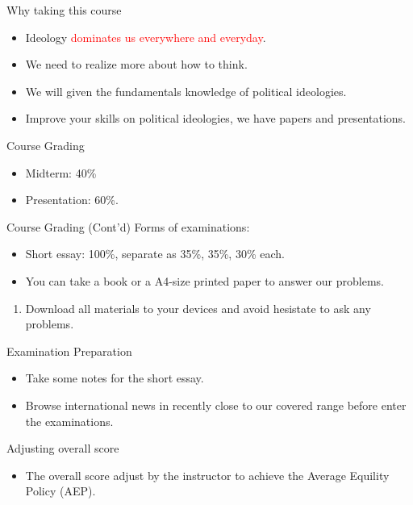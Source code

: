 \documentclass{beamer}
\begin{document}
\begin{frame}{Why taking this course}
\begin{itemize}
\item Ideology \textcolor{red}{dominates us everywhere and everyday}.
\item We need to realize more about how to think.
\item We will given the fundamentals knowledge of political ideologies.
\item Improve your skills on political ideologies, we have papers and presentations.
\end{itemize}
\end{frame}
\begin{frame}{Course Grading}
\begin{itemize}
\item Midterm: 40\%
\item Presentation: 60\%.
\end{itemize}
\end{frame}
\begin{frame}{Course Grading (Cont'd)}
Forms of examinations:
\begin{itemize}
\item Short essay: 100\%, separate as 35\%, 35\%, 30\% each.
\item You can take a book or a A4-size printed paper to answer our problems.
\end{itemize}
\begin{enumerate}
\item Download all materials to your devices and avoid hesistate to ask any problems.
\end{enumerate}
\end{frame}
\begin{frame}{Examination Preparation}
\begin{itemize}
\item Take some notes for the short essay.
\item Browse international news in recently close to our covered range before enter the examinations.
\end{itemize}
\begin{block}{Adjusting overall score}
\begin{itemize}
\item The overall score adjust by the instructor to achieve the Average Equility Policy (AEP).
\end{itemize}
\end{block}
\end{frame}
\end{document}
